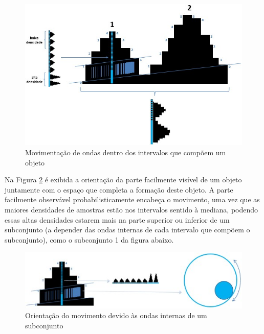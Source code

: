 	\begin{figure}[H]
	\caption{Movimentação de ondas dentro dos intervalos que compõem um objeto}
	\label{fig:consciousness_space_spiral_undulation}
	\centering
	\includegraphics[scale=.65]{sections/images/consciousness_space_spiral_undulation.jpg}
	\end{figure}

Na Figura \ref{fig:consciousness_space_spiral_direction} é exibida a orientação da parte facilmente visível de um objeto juntamente com o espaço que completa a formação deste objeto. A parte facilmente observável probabilisticamente encabeça o movimento, uma vez que as maiores densidades de amostras estão nos intervalos sentido à mediana, podendo essas altas densidades estarem mais na parte superior ou inferior de um subconjunto (a depender das ondas internas de cada intervalo que compõem o subconjunto), como o subconjunto 1 da figura abaixo.
	\begin{figure}[H]
	\caption{Orientação do movimento devido às ondas internas de um subconjunto}
	\label{fig:consciousness_space_spiral_direction}
	\centering
	\includegraphics[scale=1]{sections/images/consciousness_space_spiral_direction.jpg}
	\end{figure}

